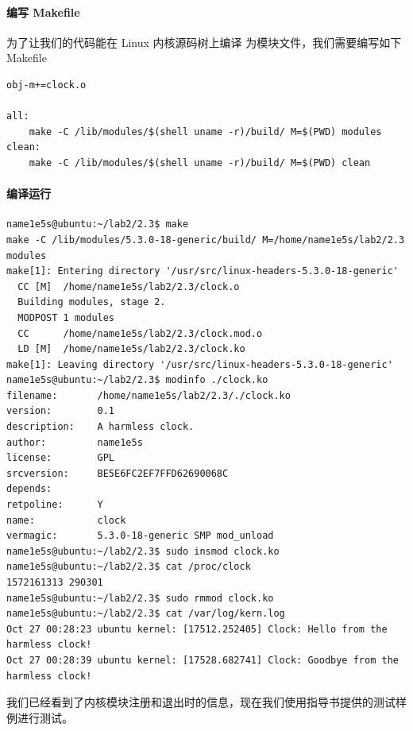\documentclass[blue,normal,cn]{elegantnote}
\begin{document}
\paragraph{编写 Makefile} 为了让我们的代码能在 Linux 内核源码树上编译
为模块文件，我们需要编写如下 Makefile
\begin{lstlisting}
obj-m+=clock.o

all:
	make -C /lib/modules/$(shell uname -r)/build/ M=$(PWD) modules
clean:
	make -C /lib/modules/$(shell uname -r)/build/ M=$(PWD) clean
\end{lstlisting}

\paragraph{编译运行}
\begin{lstlisting}
name1e5s@ubuntu:~/lab2/2.3$ make
make -C /lib/modules/5.3.0-18-generic/build/ M=/home/name1e5s/lab2/2.3 modules
make[1]: Entering directory '/usr/src/linux-headers-5.3.0-18-generic'
  CC [M]  /home/name1e5s/lab2/2.3/clock.o
  Building modules, stage 2.
  MODPOST 1 modules
  CC      /home/name1e5s/lab2/2.3/clock.mod.o
  LD [M]  /home/name1e5s/lab2/2.3/clock.ko
make[1]: Leaving directory '/usr/src/linux-headers-5.3.0-18-generic'
name1e5s@ubuntu:~/lab2/2.3$ modinfo ./clock.ko
filename:       /home/name1e5s/lab2/2.3/./clock.ko
version:        0.1
description:    A harmless clock.
author:         name1e5s
license:        GPL
srcversion:     BE5E6FC2EF7FFD62690068C
depends:
retpoline:      Y
name:           clock
vermagic:       5.3.0-18-generic SMP mod_unload
name1e5s@ubuntu:~/lab2/2.3$ sudo insmod clock.ko
name1e5s@ubuntu:~/lab2/2.3$ cat /proc/clock
1572161313 290301
name1e5s@ubuntu:~/lab2/2.3$ sudo rmmod clock.ko
name1e5s@ubuntu:~/lab2/2.3$ cat /var/log/kern.log
Oct 27 00:28:23 ubuntu kernel: [17512.252405] Clock: Hello from the harmless clock!
Oct 27 00:28:39 ubuntu kernel: [17528.682741] Clock: Goodbye from the harmless clock!
\end{lstlisting}
我们已经看到了内核模块注册和退出时的信息，现在我们使用指导书提供的测试样例进行测试。
\end{document}
